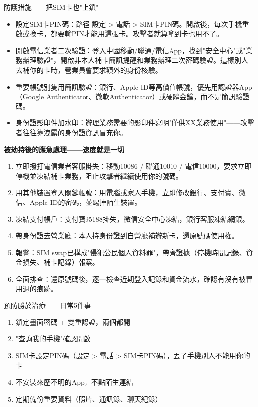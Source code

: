 \begin{tcbwarn}{防護措施——把SIM卡也"上鎖"}
\begin{itemize}
  \item 設定SIM卡PIN碼：路徑 設定 > 電話 > SIM卡PIN碼。開啟後，每次手機重啟或換卡，都要輸PIN才能用這張卡。攻擊者就算拿到卡也用不了。
  \item 開啟電信業者二次驗證：登入中國移動/聯通/電信App，找到"安全中心"或"業務辦理驗證"，開啟非本人補卡簡訊提醒和業務辦理二次密碼驗證。這樣別人去補你的卡時，營業員會要求額外的身份核驗。
  \item 重要帳號別隻用簡訊驗證：銀行、Apple ID等高價值帳號，優先用認證器App（Google Authenticator、微軟Authenticator）或硬體金鑰，而不是簡訊驗證碼。
  \item 身份證影印件加水印：辦理業務需要的影印件寫明"僅供XX業務使用"——攻擊者往往靠洩露的身份證資訊冒充你。
\end{itemize}

\end{tcbwarn}

\textbf{被劫持後的應急處理——速度就是一切}\par

\begin{enumerate}
  \item 立即撥打電信業者客服掛失：移動10086 / 聯通10010 / 電信10000，要求立即停機並凍結補卡業務，阻止攻擊者繼續使用你的號碼。
  \item 用其他裝置登入關鍵帳號：用電腦或家人手機，立即修改銀行、支付寶、微信、Apple ID的密碼，並踢掉陌生裝置。
  \item 凍結支付帳戶：支付寶95188掛失，微信安全中心凍結，銀行客服凍結網銀。
  \item 帶身份證去營業廳：本人持身份證到自營廳補辦新卡，還原號碼使用權。
  \item 報警：SIM swap已構成"侵犯公民個人資料罪"，帶齊證據（停機時間記錄、資金損失、補卡記錄）報案。
  \item 全面排查：還原號碼後，逐一檢查近期登入記錄和資金流水，確認有沒有被冒用過的痕跡。
\end{enumerate}

\begin{tcbwarn}{預防勝於治療——日常5件事}
\begin{enumerate}
  \item 鎖定畫面密碼 + 雙重認證，兩個都開
  \item "查詢我的手機"確認開啟
  \item SIM卡設定PIN碼（設定 > 電話 > SIM卡PIN碼），丟了手機別人不能用你的卡
  \item 不安裝來歷不明的App，不點陌生連結
  \item 定期備份重要資料（照片、通訊錄、聊天紀錄）
\end{enumerate}

\end{tcbwarn}

